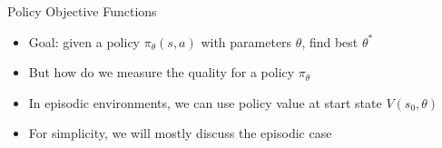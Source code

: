 \begin{frame}[c]{Policy Objective Functions}
	
	\begin{itemize}
		\item Goal: given a policy $\pi_\theta(s,a)$ with parameters $\theta$, find best $\theta^*$
		\item But how do we measure the quality for a policy $\pi_\theta$
		\item In episodic environments, we can use policy value at start state $V(s_0, \theta)$
		\item For simplicity, we will mostly discuss the episodic case
	\end{itemize}
	
\end{frame}

